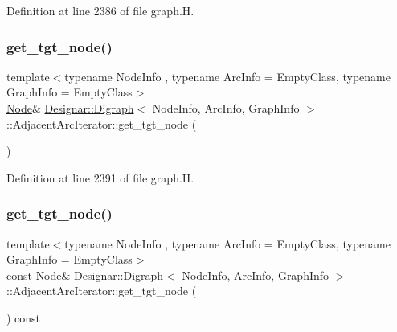 Definition at line 2386 of file graph.\+H.

\mbox{\label{class_designar_1_1_digraph_1_1_adjacent_arc_iterator_ad1df4c6624e411ea5ec10ee3d1414b1c}} 
\subsubsection{\texorpdfstring{get\+\_\+tgt\+\_\+node()}{get\_tgt\_node()}\hspace{0.1cm}{\footnotesize\ttfamily [1/2]}}
{\footnotesize\ttfamily template$<$typename Node\+Info , typename Arc\+Info  = Empty\+Class, typename Graph\+Info  = Empty\+Class$>$ \\
\hyperlink{class_designar_1_1_digraph_a4dc921c41a480b7946a04170e997d8ae}{Node}\& \hyperlink{class_designar_1_1_digraph}{Designar\+::\+Digraph}$<$ Node\+Info, Arc\+Info, Graph\+Info $>$\+::Adjacent\+Arc\+Iterator\+::get\+\_\+tgt\+\_\+node (\begin{DoxyParamCaption}{ }\end{DoxyParamCaption})\hspace{0.3cm}{\ttfamily [inline]}}



Definition at line 2391 of file graph.\+H.

\mbox{\label{class_designar_1_1_digraph_1_1_adjacent_arc_iterator_a3b5e320227b6456e9b0de9d505e0eae4}} 
\subsubsection{\texorpdfstring{get\+\_\+tgt\+\_\+node()}{get\_tgt\_node()}\hspace{0.1cm}{\footnotesize\ttfamily [2/2]}}
{\footnotesize\ttfamily template$<$typename Node\+Info , typename Arc\+Info  = Empty\+Class, typename Graph\+Info  = Empty\+Class$>$ \\
const \hyperlink{class_designar_1_1_digraph_a4dc921c41a480b7946a04170e997d8ae}{Node}\& \hyperlink{class_designar_1_1_digraph}{Designar\+::\+Digraph}$<$ Node\+Info, Arc\+Info, Graph\+Info $>$\+::Adjacent\+Arc\+Iterator\+::get\+\_\+tgt\+\_\+node (\begin{DoxyParamCaption}{ }\end{DoxyParamCaption}) const\hspace{0.3cm}{\ttfamily [inline]}}




